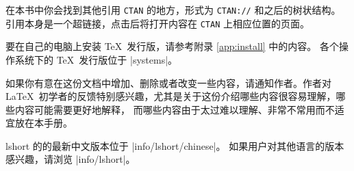在本书中你会找到其他引用 \texttt{CTAN} 的地方，形式为 \texttt{CTAN://} 和之后的树状结构。
引用本身是一个超链接，点击后将打开内容在 \texttt{CTAN} 上相应位置的页面。

要在自己的电脑上安装 \TeX\ 发行版，请参考附录 \ref{app:install} 中的内容。
各个操作系统下的 \TeX\ 发行版位于 \CTAN|systems|。

\bigskip
如果你有意在这份文档中增加、删除或者改变一些内容，请通知作者。作者对 \LaTeX\ 
初学者的反馈特别感兴趣，尤其是关于这份介绍哪些内容很容易理解，哪些内容可能需要更好地解释，
而哪些内容由于太过难以理解、非常不常用而不适宜放在本手册。

\bigskip
\begin{flushright}
\end{flushright}

\vfill

\noindent lshort 的的最新中文版本位于 \CTAN|info/lshort/chinese|。
如果用户对其他语言的版本感兴趣，请浏览 \CTAN|info/lshort|。

\smallskip

\endinput